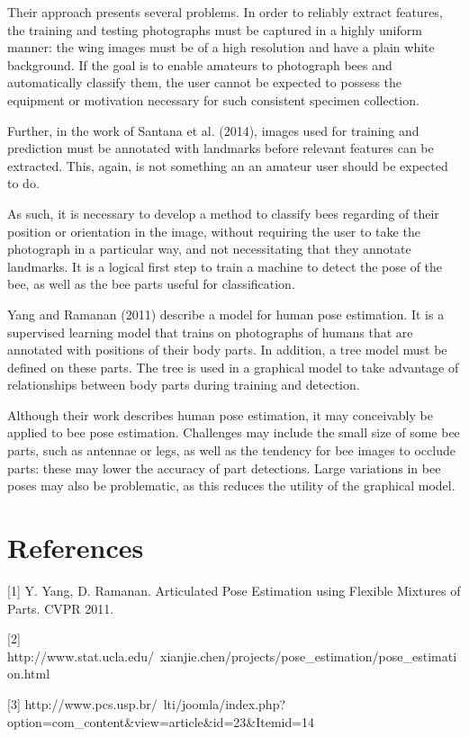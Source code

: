 \documentclass[11pt, oneside]{article}
\begin{document}
Their approach presents several problems. In order to reliably extract features,
the training and testing photographs must be captured in a highly uniform
manner: the wing images must be of a high resolution and have a plain white
background. If the goal is to enable amateurs to photograph bees and
automatically classify them, the user cannot be expected to possess the
equipment or motivation necessary for such consistent specimen collection.

Further, in the work of Santana et al. (2014), images used for training and
prediction must be annotated with landmarks before relevant features can be
extracted. This, again, is not something an an amateur user should be expected
to do.

As such, it is necessary to develop a method to classify bees regarding of their
position or orientation in the image, without requiring the user to take the
photograph in a particular way, and not necessitating that they annotate
landmarks. It is a logical first step to train a machine to detect the pose of
the bee, as well as the bee parts useful for classification.

Yang and Ramanan (2011) describe a model for human pose estimation. It is a
supervised learning model that trains on photographs of humans that are
annotated with positions of their body parts. In addition, a tree model must
be defined on these parts. The tree is used in a graphical model to take
advantage of relationships between body parts during training and detection.

Although their work describes human pose estimation, it may conceivably be
applied to bee pose estimation. Challenges may include the small size of some
bee parts, such as antennae or legs, as well as the tendency for bee images to
occlude parts: these may lower the accuracy of part detections. Large
variations in bee poses may also be problematic, as this reduces the utility of
the graphical model.


\section{References}
[1] Y. Yang, D. Ramanan. Articulated Pose Estimation using Flexible Mixtures of Parts. CVPR 2011.

[2] http://www.stat.ucla.edu/~xianjie.chen/projects/pose\_estimation/pose\_estimation.html

[3] http://www.pcs.usp.br/~lti/joomla/index.php?option=com\_content\&view=article\&id=23\&Itemid=14
\end{document}

